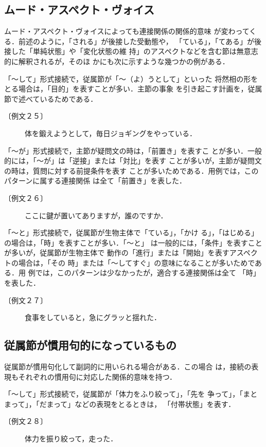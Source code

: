 \subsection{ムード・アスペクト・ヴォイス}
ムード・アスペクト・ヴォイスによっても連接関係の関係的意味
が変わってくる．前述のように，「される」が後接した受動態や，
「ている」，「てある」が後接した「単純状態」や「変化状態の維
持」のアスペクトなどを含む節は無意志的に解釈されるが，そのほ
かにも次に示すような幾つかの例がある．

「〜して」形式接続で，従属節が「〜（よ）うとして」といった
将然相の形をとる場合は，「目的」を表すことが多い．主節の事象
を引き起こす計画を，従属節で述べているためである．
\begin{description}
\item[〔例文２５〕] 体を鍛えようとして，毎日ジョギングをやっている．
\end{description}

「〜が」形式接続で，主節が疑問文の時は，「前置き」を表すこ
とが多い．一般的には，「〜が」は「逆接」または「対比」を表す
ことが多いが，主節が疑問文の時は，質問に対する前提条件を表す
ことが多いためである．用例では，このパターンに属する連接関係
は全て「前置き」を表した．
\begin{description}
\item[〔例文２６〕]ここに鍵が置いてありますが，誰のですか．
\end{description}

「〜と」形式接続で，従属節が生物主体で「ている」，「かけ
る」，「はじめる」の場合は，「時」を表すことが多い．「〜と」
は一般的には，「条件」を表すことが多いが，従属節が生物主体で
動作の「進行」または「開始」を表すアスペクトの場合は，「その
時」または「〜してすぐ」の意味になることが多いためである．用
例では，このパターンは少なかったが，適合する連接関係は全て
「時」を表した．
\begin{description}
\item[〔例文２７〕]食事をしていると，急にグラッと揺れた．
\end{description}

\subsection{従属節が慣用句的になっているもの}
従属節が慣用句化して副詞的に用いられる場合がある．この場合
は，接続の表現もそれぞれの慣用句に対応した関係的意味を持つ．

「〜して」形式接続で，従属節が「体力をふり絞って」，「先を
争って」，「まとまって」，「だまって」などの表現をとるときは，
「付帯状態」を表す．
\begin{description}
\item[〔例文２８〕]体力を振り絞って，走った．
\end{description}

